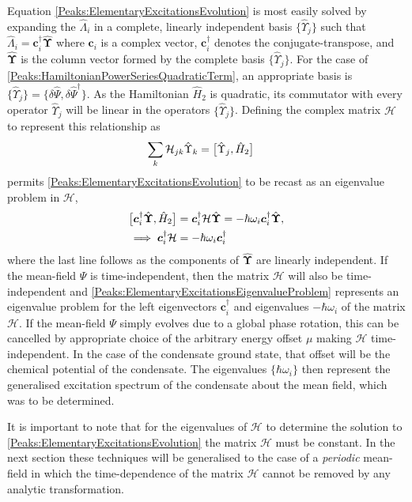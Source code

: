 Equation \eqref{Peaks:ElementaryExcitationsEvolution} is most easily solved by expanding the $\hat{\Lambda}_i$ in a complete, linearly independent basis $\{\hat{\Upsilon}_j\}$ such that $\hat{\Lambda}_i = \bm{c}_i^\dagger \hat{\bm{\Upsilon}}$ where $\bm{c}_i$ is a complex vector, $\bm{c}_i^\dagger$ denotes the conjugate-transpose, and $\hat{\bm{\Upsilon}}$ is the column vector formed by the complete basis $\{\hat{\Upsilon}_j\}$. For the case of \eqref{Peaks:HamiltonianPowerSeriesQuadraticTerm}, an appropriate basis is $\{\hat{\Upsilon}_j\} = \{\delta\hat{\Psi}, \delta\hat{\Psi}^\dagger\}$. As the Hamiltonian $\hat{H}_2$ is quadratic, its commutator with every operator $\hat{\Upsilon}_j$ will be linear in the operators $\{\hat{\Upsilon}_j\}$. Defining the complex matrix $\mathcal{H}$ to represent this relationship as
\begin{align}
    \label{Peaks:ScriptHRelationshipToHamiltonian}
    \sum_k \mathcal{H}_{jk} \hat{\Upsilon}_k &= \comm{\hat{\Upsilon}_j, \hat{H}_2}
\end{align}
permits \eqref{Peaks:ElementaryExcitationsEvolution} to be recast as an eigenvalue problem in $\mathcal{H}$,
\begin{align}
    \comm{\bm{c}_i^\dagger \hat{\bm{\Upsilon}}, \hat{H}_2} &= \bm{c}_i^\dagger \mathcal{H} \hat{\bm{\Upsilon}} = - \hbar \omega_i \bm{c}_i^\dagger \hat{\bm{\Upsilon}}, \label{Peaks:ElementaryExcitationsEigenvalueProblemWithOperators}\\
    \implies \bm{c}_i^\dagger \mathcal{H} &= - \hbar \omega_i \bm{c}_i^\dagger \label{Peaks:ElementaryExcitationsEigenvalueProblem}
\end{align}
where the last line follows as the components of $\hat{\bm{\Upsilon}}$ are linearly independent. If the mean-field $\Psi$ is time-independent, then the matrix $\mathcal{H}$ will also be time-independent and \eqref{Peaks:ElementaryExcitationsEigenvalueProblem} represents an eigenvalue problem for the left eigenvectors $\bm{c}_i^\dagger$ and eigenvalues $-\hbar \omega_i$ of the matrix $\mathcal{H}$. If the mean-field $\Psi$ simply evolves due to a global phase rotation, this can be cancelled by appropriate choice of the arbitrary energy offset $\mu$ making $\mathcal{H}$ time-independent.  In the case of the condensate ground state, that offset will be the chemical potential of the condensate. The eigenvalues $\{\hbar \omega_i\}$ then represent the generalised excitation spectrum of the condensate about the mean field, which was to be determined. 

It is important to note that for the eigenvalues of $\mathcal{H}$ to determine the solution to \eqref{Peaks:ElementaryExcitationsEvolution} the matrix $\mathcal{H}$ must be constant. In the next section these techniques will be generalised to the case of a \emph{periodic} mean-field in which the time-dependence of the matrix $\mathcal{H}$ cannot be removed by any analytic transformation.

